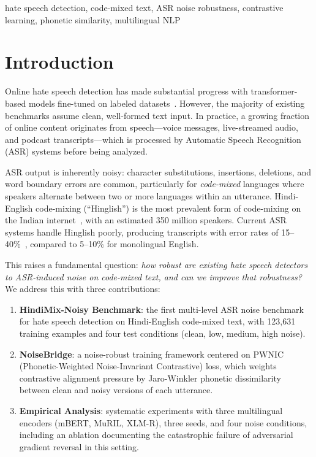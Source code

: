 \documentclass[conference]{IEEEtran}
\begin{document}
\begin{IEEEkeywords}
hate speech detection, code-mixed text, ASR noise robustness, contrastive learning, phonetic similarity, multilingual NLP
\end{IEEEkeywords}

\section{Introduction}

Online hate speech detection has made substantial progress with transformer-based models fine-tuned on labeled datasets~\cite{davidson2017automated, mathew2021hatexplain}. However, the majority of existing benchmarks assume clean, well-formed text input. In practice, a growing fraction of online content originates from speech---voice messages, live-streamed audio, and podcast transcripts---which is processed by Automatic Speech Recognition (ASR) systems before being analyzed.

ASR output is inherently noisy: character substitutions, insertions, deletions, and word boundary errors are common, particularly for \textit{code-mixed} languages where speakers alternate between two or more languages within an utterance. Hindi-English code-mixing (``Hinglish'') is the most prevalent form of code-mixing on the Indian internet~\cite{barman2014code}, with an estimated 350 million speakers. Current ASR systems handle Hinglish poorly, producing transcripts with error rates of 15--40\%~\cite{shah2020learning}, compared to 5--10\% for monolingual English.

This raises a fundamental question: \textit{how robust are existing hate speech detectors to ASR-induced noise on code-mixed text, and can we improve that robustness?} We address this with three contributions:

\begin{enumerate}
\item \textbf{HindiMix-Noisy Benchmark}: the first multi-level ASR noise benchmark for hate speech detection on Hindi-English code-mixed text, with 123,631 training examples and four test conditions (clean, low, medium, high noise).

\item \textbf{NoiseBridge}: a noise-robust training framework centered on PWNIC (Phonetic-Weighted Noise-Invariant Contrastive) loss, which weights contrastive alignment pressure by Jaro-Winkler phonetic dissimilarity between clean and noisy versions of each utterance.

\item \textbf{Empirical Analysis}: systematic experiments with three multilingual encoders (mBERT, MuRIL, XLM-R), three seeds, and four noise conditions, including an ablation documenting the catastrophic failure of adversarial gradient reversal in this setting.
\end{enumerate}
\end{document}
